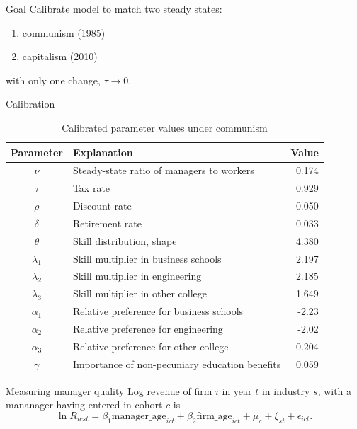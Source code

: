 \documentclass[
  ignorenonframetext,
  aspectratio=1610,
]{beamer}
\providecommand{\tightlist}{%
  \setlength{\itemsep}{0pt}\setlength{\parskip}{0pt}}
\begin{document}
\begin{frame}{Goal}
\protect\hypertarget{goal}{}
Calibrate model to match two steady states:

\begin{enumerate}
\tightlist
\item
  communism (1985)
\item
  capitalism (2010)
\end{enumerate}

with only one change, \(\tau\to 0\).
\end{frame}

\begin{frame}{Calibration}
\protect\hypertarget{calibration}{}
\begin{table}[ht!]
\centering
\caption{Calibrated parameter values under communism}   
\begin{tabular}{clr}
  \hline
Parameter & Explanation & Value \\
    \hline
$\nu$ & Steady-state ratio of managers to workers & 0.174 \\
$\tau$ & Tax rate & 0.929 \\
$\rho$ & Discount rate & 0.050 \\
$\delta$ & Retirement rate & 0.033 \\
$\theta$ & Skill distribution, shape & 4.380 \\
$\lambda_1$ & Skill multiplier in business schools & 2.197 \\
$\lambda_2$ & Skill multiplier in engineering & 2.185 \\
$\lambda_3$ & Skill multiplier in other college & 1.649 \\
$\alpha_1$ & Relative preference for business schools & -2.23 \\
$\alpha_2$ & Relative preference for engineering & -2.02 \\
$\alpha_3$ & Relative preference for other college & -0.204 \\
$\gamma$ & Importance of non-pecuniary education benefits & 0.059 \\
    \hline
\end{tabular}
\end{table}
\end{frame}

\begin{frame}{Measuring manager quality}
\protect\hypertarget{measuring-manager-quality}{}
Log revenue of firm \(i\) in year \(t\) in industry \(s\), with a
mananager having entered in cohort \(c\) is \[
\ln R_{icst} = \beta_1\text{manager\_age}_{ict} + \beta_2\text{firm\_age}_{ict}  + \mu_{c} + \xi_{st} + \epsilon_{ict}.
\]
\end{frame}
\end{document}
